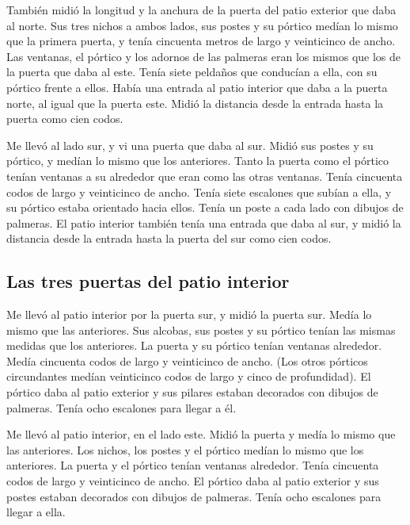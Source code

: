  También midió la longitud y la anchura de la puerta del
patio exterior que daba al norte.  Sus tres nichos a
ambos lados, sus postes y su pórtico medían lo mismo que la primera
puerta, y tenía cincuenta metros de largo y veinticinco de ancho.
 Las ventanas, el pórtico y los adornos de las palmeras
eran los mismos que los de la puerta que daba al este. Tenía siete
peldaños que conducían a ella, con su pórtico frente a ellos.
 Había una entrada al patio interior que daba a la puerta
norte, al igual que la puerta este. Midió la distancia desde la entrada
hasta la puerta como cien codos.

 Me llevó al lado sur, y vi una puerta que daba al sur.
Midió sus postes y su pórtico, y medían lo mismo que los anteriores.
 Tanto la puerta como el pórtico tenían ventanas a su
alrededor que eran como las otras ventanas. Tenía cincuenta codos de
largo y veinticinco de ancho.  Tenía siete escalones que
subían a ella, y su pórtico estaba orientado hacia ellos. Tenía un poste
a cada lado con dibujos de palmeras.  El patio interior
también tenía una entrada que daba al sur, y midió la distancia desde la
entrada hasta la puerta del sur como cien codos.

\hypertarget{las-tres-puertas-del-patio-interior}{%
\subsection{Las tres puertas del patio
interior}\label{las-tres-puertas-del-patio-interior}}

 Me llevó al patio interior por la puerta sur, y midió la
puerta sur. Medía lo mismo que las anteriores.  Sus
alcobas, sus postes y su pórtico tenían las mismas medidas que los
anteriores. La puerta y su pórtico tenían ventanas alrededor. Medía
cincuenta codos de largo y veinticinco de ancho.  (Los
otros pórticos circundantes medían veinticinco codos de largo y cinco de
profundidad).  El pórtico daba al patio exterior y sus
pilares estaban decorados con dibujos de palmeras. Tenía ocho escalones
para llegar a él.

 Me llevó al patio interior, en el lado este. Midió la
puerta y medía lo mismo que las anteriores.  Los nichos,
los postes y el pórtico medían lo mismo que los anteriores. La puerta y
el pórtico tenían ventanas alrededor. Tenía cincuenta codos de largo y
veinticinco de ancho.  El pórtico daba al patio exterior
y sus postes estaban decorados con dibujos de palmeras. Tenía ocho
escalones para llegar a ella.

